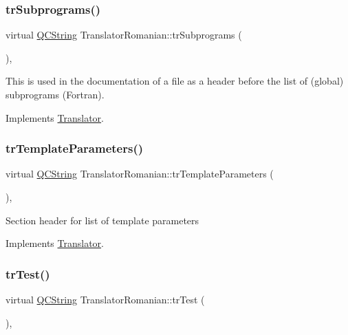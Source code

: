 \subsubsection{\texorpdfstring{trSubprograms()}{trSubprograms()}}
{\footnotesize\ttfamily virtual \mbox{\hyperlink{class_q_c_string}{Q\+C\+String}} Translator\+Romanian\+::tr\+Subprograms (\begin{DoxyParamCaption}{ }\end{DoxyParamCaption})\hspace{0.3cm}{\ttfamily [inline]}, {\ttfamily [virtual]}}

This is used in the documentation of a file as a header before the list of (global) subprograms (Fortran). 

Implements \mbox{\hyperlink{class_translator}{Translator}}.

\mbox{\label{class_translator_romanian_a20217c75d409bc30a66993e044a25d9a}} 
\subsubsection{\texorpdfstring{trTemplateParameters()}{trTemplateParameters()}}
{\footnotesize\ttfamily virtual \mbox{\hyperlink{class_q_c_string}{Q\+C\+String}} Translator\+Romanian\+::tr\+Template\+Parameters (\begin{DoxyParamCaption}{ }\end{DoxyParamCaption})\hspace{0.3cm}{\ttfamily [inline]}, {\ttfamily [virtual]}}

Section header for list of template parameters 

Implements \mbox{\hyperlink{class_translator}{Translator}}.

\mbox{\label{class_translator_romanian_ad91689bcae63b0dd880ff85e112584f4}} 
\subsubsection{\texorpdfstring{trTest()}{trTest()}}
{\footnotesize\ttfamily virtual \mbox{\hyperlink{class_q_c_string}{Q\+C\+String}} Translator\+Romanian\+::tr\+Test (\begin{DoxyParamCaption}{ }\end{DoxyParamCaption})\hspace{0.3cm}{\ttfamily [inline]}, {\ttfamily [virtual]}}


